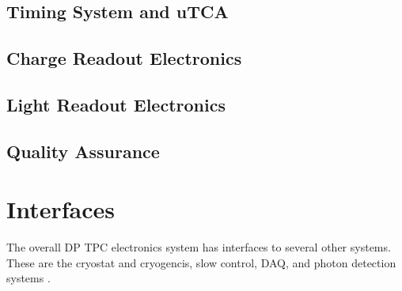\subsection{Timing System and uTCA}
\label{sec:fddp-tpc-elec-prod-utca}



\subsection{Charge Readout Electronics}
\label{sec:fddp-tpc-elec-prod-cro}

\subsection{Light Readout Electronics}
\label{sec:fddp-tpc-elec-prod-lro}


\subsection{Quality Assurance}
\label{sec:fddp-tpc-elec-qa}


\section{Interfaces}
\label{sec:fddp-tpc-elec-intfc}

The overall DP TPC electronics system has interfaces to several other systems. These are the cryostat and cryogencis, slow control, DAQ, and photon detection systems .

